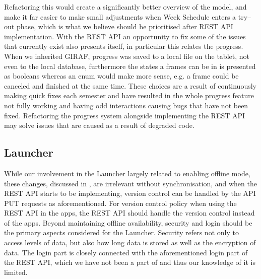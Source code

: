 Refactoring this would create a significantly better overview of the model, and make it far easier to make small adjustments when Week Schedule enters a try--out phase, which is what we believe should be prioritised after REST API implementation.
With the REST API an opportunity to fix some of the issues that currently exist also presents itself, in particular this relates the progress.
When we inherited GIRAF, progress was saved to a local file on the tablet, not even to the local database, furthermore the states a frames can be in is presented as booleans whereas an enum would make more sense, e.g. a frame could be canceled and finished at the same time.
These choices are a result of continuously making quick fixes each semester and have resulted in the whole progress feature not fully working and having odd interactions causing bugs that have not been fixed.
Refactoring the progress system alongside implementing the REST API may solve issues that are caused as a result of degraded code.

\subsection*{Launcher}
While our involvement in the Launcher largely related to enabling offline mode, these changes, discussed in , are irrelevant without synchronisation, and when the REST API starts to be implementing, version control can be handled by the API PUT requests as aforementioned.
For version control policy when using the REST API in the apps, the REST API should handle the version control instead of the apps.
Beyond maintaining offline availability, security and login should be the primary aspects considered for the Launcher.
Security refers not only to access levels of data, but also how long data is stored as well as the encryption of data.
The login part is closely connected with the aforementioned login part of the REST API, which we have not been a part of and thus our knowledge of it is limited.


